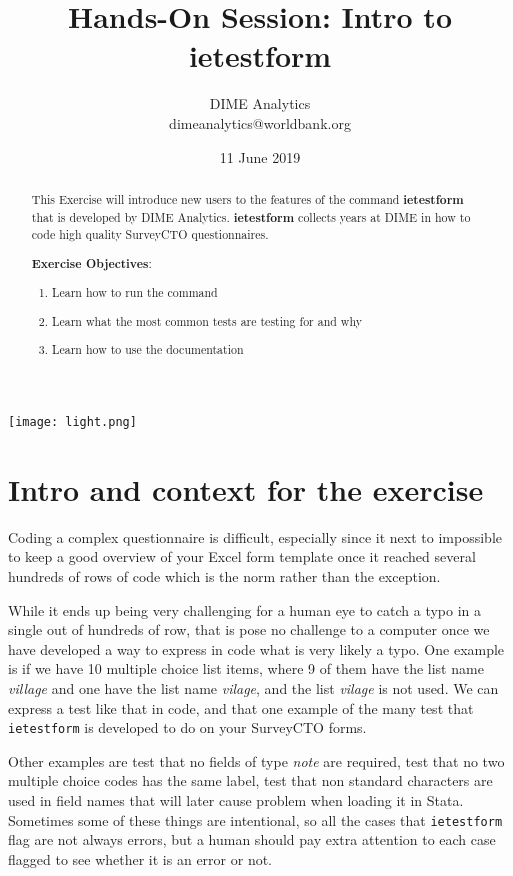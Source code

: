 \documentclass{tufte-handout}
\title{Hands-On Session: Intro to ietestform}
\author{DIME Analytics \\ dimeanalytics@worldbank.org}
\date{11 June 2019}  %
\begin{document}
\maketitle%

\begin{marginfigure}%
  \texttt{[image: light.png]}
\end{marginfigure}

\begin{abstract}
This Exercise will introduce new users to the features of the command \textbf{ietestform} that is developed by DIME Analytics. \textbf{ietestform} collects years at DIME in how to code high quality SurveyCTO questionnaires.


\bigskip\noindent \textbf{Exercise Objectives}:
\begin{enumerate}
  \item Learn how to run the command
  \item Learn what the most common tests are testing for and why
  \item Learn how to use the documentation 
\end{enumerate}
\end{abstract}

\section{Intro and context for the exercise}

Coding a complex questionnaire is difficult, especially since it next to impossible to keep a good overview of your Excel form template once it reached several hundreds of rows of code which is the norm rather than the exception.

While it ends up being very challenging for a human eye to catch a typo in a single out of hundreds of row, that is pose no challenge to a computer once we have developed a way to express in code what is very likely a typo. One example is if we have 10 multiple choice list items, where 9 of them have the list name \textit{village} and one have the list name \textit{vilage}, and the list \textit{vilage} is not used. We can express a test like that in code, and that one example of the many test that \verb|ietestform| is developed to do on your SurveyCTO forms.

Other examples are test that no fields of type \textit{note} are required, test that no two multiple choice codes has the same label, test that non standard characters are used in field names that will later cause problem when loading it in Stata. Sometimes some of these things are intentional, so all the cases that \verb|ietestform| flag are not always errors, but a human should pay extra attention to each case flagged to see whether it is an error or not.
\end{document}
